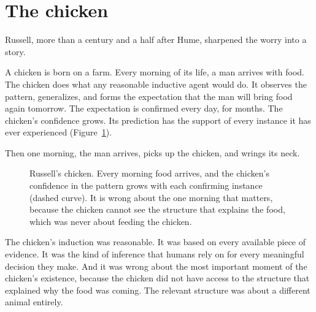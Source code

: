 \section*{The chicken}

Russell, more than a century and a half after Hume, sharpened the worry into a story.

A chicken is born on a farm. Every morning of its life, a man arrives with food. The chicken does what any reasonable inductive agent would do. It observes the pattern, generalizes, and forms the expectation that the man will bring food again tomorrow. The expectation is confirmed every day, for months. The chicken's confidence grows. Its prediction has the support of every instance it has ever experienced (Figure~\ref{fig:chicken}).

Then one morning, the man arrives, picks up the chicken, and wrings its neck.

\begin{figure}[h]
\centering
{}
\caption{Russell's chicken. Every morning food arrives, and the chicken's confidence in the pattern grows with each confirming instance (dashed curve). It is wrong about the one morning that matters, because the chicken cannot see the structure that explains the food, which was never about feeding the chicken.}
\label{fig:chicken}
\end{figure}

The chicken's induction was reasonable. It was based on every available piece of evidence. It was the kind of inference that humans rely on for every meaningful decision they make. And it was wrong about the most important moment of the chicken's existence, because the chicken did not have access to the structure that explained why the food was coming. The relevant structure was about a different animal entirely.

